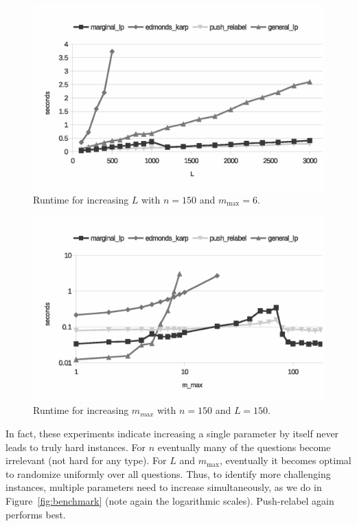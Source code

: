 \documentclass{article}
\begin{document}
\begin{figure}
	\caption{Runtime for increasing $L$ with 
$n = 150$ and $m_{\text{max}} = 6$.}\label{fig:individual_L}
	\includegraphics[trim=0 20mm 0 0, clip, width=\linewidth]{individual_L}
\end{figure}

\begin{figure}
	\caption{Runtime for increasing $m_{max}$ with 
$n = 150$ and $L = 150$.}\label{fig:individual_m}
	\includegraphics[trim=0 20mm 0 0, clip, width=\linewidth]{individual_m}
\end{figure}


In fact, these experiments indicate increasing a single parameter by itself
never leads to truly hard instances.  For $n$ eventually many of the
questions become irrelevant (not hard for any type).  For $L$ and
$m_\text{max}$, eventually it becomes optimal to randomize uniformly over
all questions.
Thus, to identify more challenging instances, multiple parameters need to
increase simultaneously, as we do in Figure~\ref{fig:benchmark} (note again
the logarithmic scales).  Push-relabel again performs best.
\end{document}
